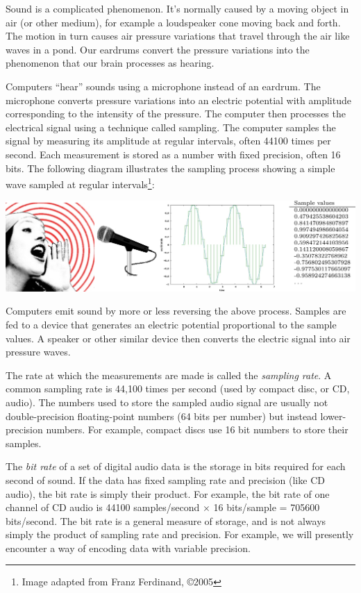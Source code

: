 \documentclass[10pt]{article}
\begin{document}
Sound is a complicated phenomenon. It's normally caused by a moving object in
air (or other medium), for example a loudspeaker cone moving back and forth.
The motion in turn causes air pressure variations that travel through the air
like waves in a pond. Our eardrums convert the pressure variations into the
phenomenon that our brain processes as hearing.

Computers ``hear'' sounds using a microphone instead of an eardrum. The
microphone converts pressure variations into an electric potential with
amplitude corresponding to the intensity of the pressure. The computer then
processes the electrical signal using a technique called sampling. The computer
samples the signal by measuring its amplitude at regular intervals, often
44100 times per second. Each measurement is stored as a number with fixed
precision, often 16 bits. The following diagram illustrates the sampling
process showing a simple wave sampled at regular intervals\footnote{Image
adapted from Franz Ferdinand, \copyright 2005}:
\begin{center}
\includegraphics[width=5.5in]{fig1}
\end{center}

Computers emit sound by more or less reversing the above process. Samples are
fed to a device that generates an electric potential proportional to the sample
values. A speaker or other similar device then converts the electric signal
into air pressure waves.

The rate at which the measurements are made is called the {\it sampling rate}.
A common sampling rate is 44,100 times per second (used by compact disc, or CD,
audio). The numbers used to store the sampled audio signal are usually not
double-precision floating-point numbers (64 bits per number) but instead
lower-precision numbers. For example, compact discs use 16 bit numbers to store
their samples.

The {\it bit rate} of a set of digital audio data is the storage in bits
required for each second of sound. If the data has fixed sampling rate and
precision (like CD audio), the bit rate is simply their product. For example,
the bit rate of one channel of CD audio is 44100 samples/second $\times$ 16
bits/sample = 705600 bits/second. The bit rate is a general measure of
storage, and is not always simply the product of sampling rate and precision.
For example, we will presently encounter a way of encoding data with variable
precision.
\end{document}
